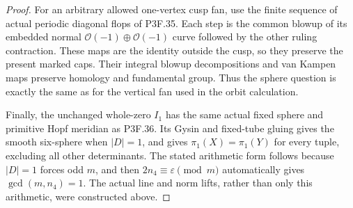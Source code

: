 \begin{proof}
For an arbitrary allowed one-vertex cusp fan, use the finite sequence
of actual periodic diagonal flops of P3F.35. Each step is the common
blowup of its embedded normal \(\mathcal O(-1)\oplus\mathcal O(-1)\)
curve followed by the other ruling contraction. These maps are the
identity outside the cusp, so they preserve the present marked caps.
Their integral blowup decompositions and van Kampen maps preserve
homology and fundamental group. Thus the sphere question is exactly
the same as for the vertical fan used in the orbit calculation.

Finally, the unchanged whole-zero \(I_1\) has the same actual
fixed sphere and primitive Hopf meridian as P3F.36. Its Gysin and
fixed-tube gluing gives the smooth six-sphere when \(|D|=1\),
and gives \(\pi_1(X)=\pi_1(Y)\) for every tuple, excluding
all other determinants. The stated arithmetic form follows because
\(|D|=1\) forces odd \(m\), and then
\(2n_4\equiv\varepsilon\pmod m\) automatically gives
\(\gcd(m,n_4)=1\). The actual line and norm lifts, rather than
only this arithmetic, were constructed above.
\end{proof}
